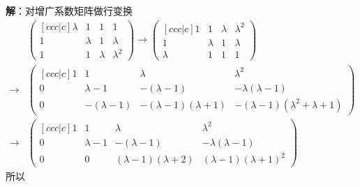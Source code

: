 {\bf 解}：对增广系数矩阵做行变换
\begin{align*}
& \begin{pmatrix}[ccc|c]
  \lambda & 1 & 1 & 1\\
  1 & \lambda & 1 & \lambda \\
  1 & 1 & \lambda & \lambda^2
\end{pmatrix}
\to
\begin{pmatrix}[ccc|c]
  1 & 1 & \lambda & \lambda^2 \\
  1 & \lambda & 1 & \lambda \\
  \lambda & 1 & 1 & 1
\end{pmatrix} \\
\to &
\begin{pmatrix}[ccc|c]
  1 & 1 & \lambda & \lambda^2 \\
  0 & \lambda-1 & -(\lambda-1) & -\lambda(\lambda-1) \\
  0 & -(\lambda-1) & -(\lambda-1)(\lambda+1) & -(\lambda-1)(\lambda^2+\lambda+1)
\end{pmatrix} \\
\to &
\begin{pmatrix}[ccc|c]
  1 & 1 & \lambda & \lambda^2 \\
  0 & \lambda-1 & -(\lambda-1) & -\lambda(\lambda-1) \\
  0 & 0 & (\lambda-1)(\lambda+2) & (\lambda-1)(\lambda+1)^2
\end{pmatrix}
\end{align*}
所以

